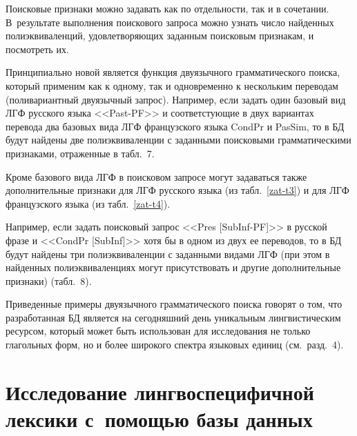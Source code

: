 \begin{multicols}{2}
  Поисковые признаки можно задавать как по отдельности, так и в сочетании.
В~результате выполнения поискового запроса можно узнать число найденных
полиэквиваленций, удовлетворяющих заданным поисковым признакам, и
посмотреть их.

  Принципиально новой является функция двуязычного грамматического
поиска, который применим как к одному, так и одновременно к нескольким
переводам (поливариантный двуязычный запрос).
%
Например, если задать один
базовый вид ЛГФ русского языка <<Past-PF>> и соответстующие в двух
вариантах перевода два базовых вида ЛГФ французского языка CondPr и
PasSim, то в БД будут найдены две полиэквиваленции с заданными
поисковыми грамматическими признаками, отраженные в табл.~7.



  Кроме базового вида ЛГФ в поисковом запросе могут задаваться также
дополнительные признаки для ЛГФ русского языка (из табл.~\ref{zat-t3}) и для
ЛГФ французского языка (из табл.~\ref{zat-t4}).

Например, если задать
поисковый запрос <<Pres [SubInf-PF]>> в русской фразе и <<CondPr [SubInf]>>
хотя бы в одном из двух ее переводов, то в БД будут найдены три
полиэквиваленции с заданными видами ЛГФ (при этом в найденных
полиэквиваленциях могут присутствовать и другие дополнительные признаки)
(табл.~8).

  Приведенные примеры двуязычного грамматического поиска говорят о том,
что разработанная БД является на сегодняшний день уникальным
лингвистическим ресурсом, который может быть использован для
исследования не только глагольных форм, но и более широкого спектра
языковых единиц (см.\ разд.~4).

\vspace*{-12pt}

\section{Исследование лингвоспецифичной лексики с~помощью базы данных} %


\end{multicols}
